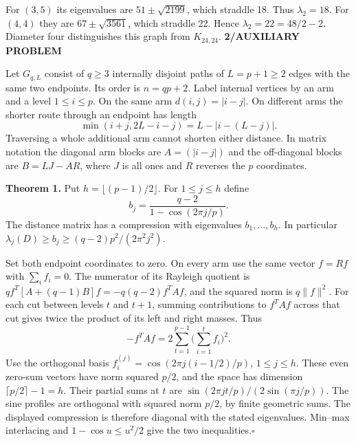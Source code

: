 \documentclass[11pt,a4paper]{article}
\newcommand{\head}[1]{\par\medskip{\sffamily\bfseries\color{teal}#1}\par\smallskip}
\newcommand{\parthead}[2]{{\sffamily\small\bfseries\color{teal}#1}\par\vspace{2mm}{\sffamily\bfseries\color{ink}\fontsize{21}{25}\selectfont #2\par}\vspace{2mm}}
\newcommand{\hd}[1]{\textbf{#1.}}
\begin{document}
For $(3,5)$ its eigenvalues are $51\pm\sqrt{2199}$, which straddle 18. Thus $\lambda_2=18$. For $(4,4)$ they are $67\pm\sqrt{3561}$, which straddle 22. Hence $\lambda_2=22=48/2-2$. Diameter four distinguishes this graph from $K_{24,24}$.
\newpage
{}
\parthead{2\quad /\quad AUXILIARY PROBLEM}{Large eigenvalues on three parallel paths}
Let $G_{q,L}$ consist of $q\ge3$ internally disjoint paths of $L=p+1\ge2$ edges with the same two endpoints. Its order is $n=qp+2$. Label internal vertices by an arm and a level $1\le i\le p$. On the same arm $d(i,j)=|i-j|$. On different arms the shorter route through an endpoint has length
\[
 \min(i+j,2L-i-j)=L-|i-(L-j)|.
\]
Traversing a whole additional arm cannot shorten either distance. In matrix notation the diagonal arm blocks are $A=(|i-j|)$ and the off-diagonal blocks are $B=LJ-AR$, where $J$ is all ones and $R$ reverses the $p$ coordinates.
\begin{center}
\end{center}
\hd{Theorem 1} Put $h=\lfloor(p-1)/2\rfloor$. For $1\le j\le h$ define
\[
 b_j=\frac{q-2}{1-\cos(2\pi j/p)}.
\]
The distance matrix has a compression with eigenvalues $b_1,\ldots,b_h$. In particular $\lambda_j(D)\ge b_j\ge(q-2)p^2/(2\pi^2j^2)$.
\head{Proof}
Set both endpoint coordinates to zero. On every arm use the same vector $f=Rf$ with $\sum_i f_i=0$. The numerator of its Rayleigh quotient is $q f^T[A+(q-1)B]f=-q(q-2) f^TAf$, and the squared norm is $q\|f\|^2$. For each cut between levels $t$ and $t+1$, summing contributions to $f^TAf$ across that cut gives twice the product of its left and right masses. Thus
\[
 -f^TAf=2\sum_{t=1}^{p-1}\Big(\sum_{i=1}^t f_i\Big)^2 .
\]
Use the orthogonal basis $f_i^{(j)}=\cos(2\pi j(i-1/2)/p)$, $1\le j\le h$. These even zero-sum vectors have norm squared $p/2$, and the space has dimension $\lceil p/2\rceil-1=h$. Their partial sums at $t$ are $\sin(2\pi jt/p)/(2\sin(\pi j/p))$. The sine profiles are orthogonal with squared norm $p/2$, by finite geometric sums. The displayed compression is therefore diagonal with the stated eigenvalues. Min--max interlacing and $1-\cos u\le u^2/2$ give the two inequalities.\hfill$\square$
\end{document}
